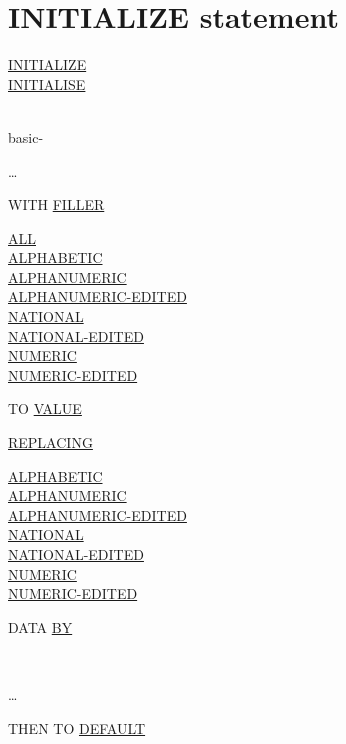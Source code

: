 \documentclass[a4paper,oneside,svgnames]{scrbook}
\makeatletter
\newcommand{\key}[1]{\underline{#1}}
\newcommand{\miscext}[1]{%
  \colorbox{blue!50}{#1}}
\newenvironment{0-1}{$\left[ \begin{tabular}{@{}l@{}}}{\end{tabular} \right]$}
\newenvironment{1=}{$\left\{ \begin{tabular}{@{}l@{}}}{\end{tabular} \right\}$}
\makeatother
\begin{document}
\section{INITIALIZE statement}

\begin{1=}
  \key{INITIALIZE} \\
  \miscext{\key{INITIALISE}}
\end{1=}
\begin{1=}
  \identifier \\
  basic-\literal
\end{1=} \ldots
\begin{0-1}
  WITH \key{FILLER}
\end{0-1}

\begin{0-1}
  \begin{1=}
    \key{ALL} \\
    \key{ALPHABETIC} \\
    \key{ALPHANUMERIC} \\
    \key{ALPHANUMERIC-EDITED} \\
    \key{NATIONAL} \\
    \key{NATIONAL-EDITED} \\
    \key{NUMERIC} \\
    \key{NUMERIC-EDITED}
  \end{1=}
  TO \key{VALUE}
\end{0-1}

\begin{0-1}
  \key{REPLACING}
  \begin{1=}
    \begin{1=}
      \key{ALPHABETIC} \\
      \key{ALPHANUMERIC} \\
      \key{ALPHANUMERIC-EDITED} \\
      \key{NATIONAL} \\
      \key{NATIONAL-EDITED} \\
      \key{NUMERIC} \\
      \key{NUMERIC-EDITED}
    \end{1=}
    DATA \key{BY}
    \begin{1=}
      \identifier \\
      \literal
    \end{1=}
  \end{1=} \ldots
\end{0-1}

\begin{0-1}
  THEN TO \key{DEFAULT}
\end{0-1}
\end{document}
